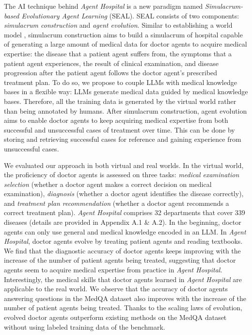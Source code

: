 \documentclass[fleqn,12pt]{wlscirep}
\begin{document}
The AI technique behind {\it Agent Hospital} is a new paradigm named {\it Simulacrum-based Evolutionary Agent Learning} (SEAL). SEAL consists of two components: {\it simulacrum construction} and {\it agent evolution}. 
Similar to establishing a world model \cite{LeCun:22:WorldModel}, simulacrum construction aims to build a simulacrum of hospital capable of generating a large amount of medical data for doctor agents to acquire medical expertise: the disease that a patient agent suffers from, the symptoms that a patient agent experiences, the result of clinical examination, and disease progression after the patient agent follows the doctor agent's prescribed treatment plan. To do so, we propose to couple LLMs with medical knowledge bases in a flexible way: LLMs generate medical data guided by medical knowledge bases. Therefore, all the training data is generated by the virtual world rather than being annotated by humans. 
After simulacrum construction, agent evolution aims to enable doctor agents to keep acquiring medical expertise from both successful and unsuccessful cases of treatment over time. This can be done by storing and retrieving successful cases for reference and gaining experience from unsuccessful cases.

We evaluated our approach in both virtual and real worlds. 
In the virtual world, the proficiency of doctor agents is assessed on three tasks: {\it medical examination selection} (whether a doctor agent makes a correct decision on medical examination), {\it diagnosis} (whether a doctor agent identifies the disease correctly), and {\it treatment plan recommendation} (whether a doctor agent recommends a correct treatment plan). {\it Agent Hospital} comprises 32 departments that cover 339 diseases (details are provided in Appendix A.1 \& A.2). In the beginning, doctor agents can only use general and medical knowledge encoded in an LLM. In {\it Agent Hospital}, doctor agents evolve by treating patient agents and reading textbooks. We find that the diagnostic accuracy of doctor agents keeps improving with the increase of the number of patient agents being treated, suggesting that doctor agents seem to acquire medical expertise from practice in {\it Agent Hospital}. 
Interestingly, the medical skills that doctor agents learned in {\it Agent Hospital} are applicable to the real world. We observe that the accuracy of doctor agents answering questions in the MedQA dataset\cite{Jin:21:MedQA} also improves with the increase of the number of patient agents being treated. Thanks to the scaling laws of evolution, evolved doctor agents outperform existing methods on the MedQA dataset without using labeled training data of the benchmark.
\end{document}

